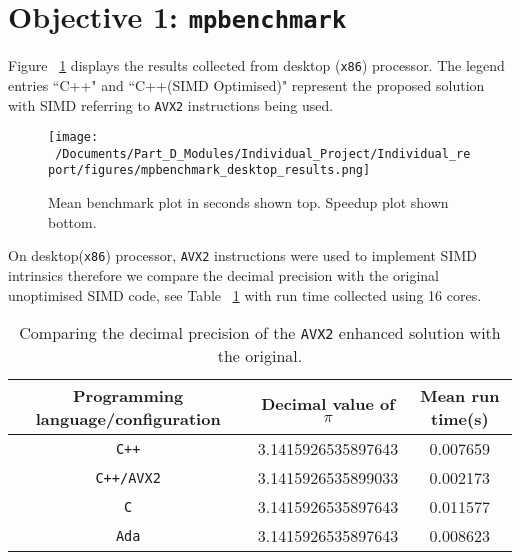 \section{Objective 1: \texttt{mpbenchmark}}

Figure ~\ref{fig:mpbenchmark_desktop_plot} displays the results collected from desktop (\texttt{x86}) processor. The legend entries ``C++" and ``C++(SIMD Optimised)" represent the proposed solution with SIMD referring to \texttt{AVX2} instructions being used. 

\begin{figure}[htbp] %
	\centering
	\texttt{[image: ~/Documents/Part\_D\_Modules/Individual\_Project/Individual\_report/figures/mpbenchmark\_desktop\_results.png]} %
	\caption{Mean benchmark plot in seconds shown top. Speedup plot shown bottom.}
	\label{fig:mpbenchmark_desktop_plot} %
\end{figure}


On desktop(\texttt{x86}) processor, \texttt{AVX2} instructions were used to implement SIMD intrinsics therefore we compare the decimal precision with the original unoptimised SIMD code, see Table ~\ref{tab:c++_avx2_pi} with run time collected using 16 cores. 

\begin{table}[htbp]
	\centering
	\begin{tabular}{|c|c|c|}
		\hline
		\textbf{Programming language/configuration} & \textbf{Decimal value of $\pi$} & \textbf{Mean run time(s)} \\ \hline
		\texttt{C++}             & 3.1415926535897643 &  0.007659 \\ \hline
		\texttt{C++/AVX2}   & 3.1415926535899033 &  0.002173  \\ \hline
		\texttt{C}                 & 3.1415926535897643 & 0.011577 \\ \hline
		\texttt{Ada}             & 3.1415926535897643 &  0.008623\\ \hline
	\end{tabular}
	\label{tab:c++_avx2_pi}
	\caption{Comparing the decimal precision of the \texttt{AVX2} enhanced solution with the original.}
\end{table}


